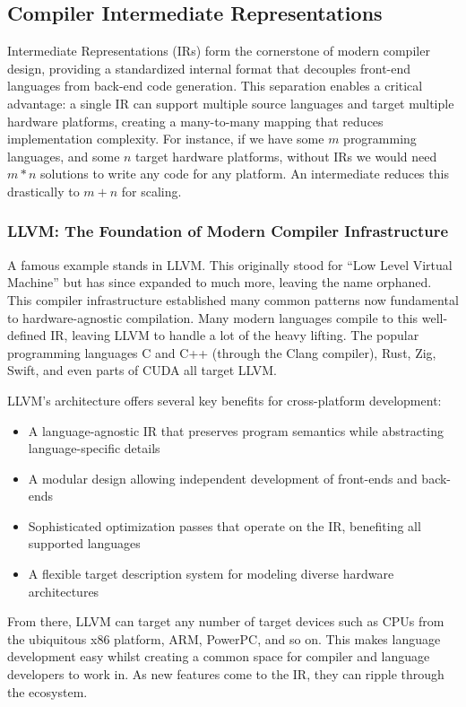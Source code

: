 \documentclass[manuscript,screen,review,format=acmsmall]{acmart}
\begin{document}
\subsection{Compiler Intermediate Representations}

Intermediate Representations (IRs) form the cornerstone of modern compiler design, providing a standardized internal format that decouples front-end languages from back-end code generation. This separation enables a critical advantage: a single IR can support multiple source languages and target multiple hardware platforms, creating a many-to-many mapping that reduces implementation complexity. For instance, if we have some $m$ programming languages, and some $n$ target hardware platforms, without IRs we would need $m * n$ solutions to write any code for any platform. An intermediate reduces this drastically to $m + n$ for scaling.

\subsubsection{LLVM: The Foundation of Modern Compiler Infrastructure}

A famous example stands in LLVM. This originally stood for “Low Level Virtual Machine” but has since expanded to much more, leaving the name orphaned. This compiler infrastructure established many common patterns now fundamental to hardware-agnostic compilation. Many modern languages compile to this well-defined IR, leaving LLVM to handle a lot of the heavy lifting. The popular programming languages C and C++ (through the Clang compiler), Rust, Zig, Swift, and even parts of CUDA all target LLVM.

LLVM's architecture offers several key benefits for cross-platform development:
\begin{itemize}
    \item A language-agnostic IR that preserves program semantics while abstracting language-specific details
    \item A modular design allowing independent development of front-ends and back-ends
    \item Sophisticated optimization passes that operate on the IR, benefiting all supported languages
    \item A flexible target description system for modeling diverse hardware architectures
\end{itemize}


From there, LLVM can target any number of target devices such as CPUs from the ubiquitous x86 platform, ARM, PowerPC, and so on. This makes language development easy whilst creating a common space for compiler and language developers to work in. As new features come to the IR, they can ripple through the ecosystem. 
\end{document}
